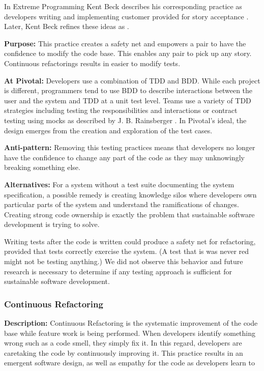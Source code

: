 \begin{table}[]
In Extreme Programming Kent Beck describes his corresponding  practice as developers writing  and implementing customer provided  for story acceptance \cite{ExtremeProgramming2000}. Later, Kent Beck refines these ideas as  \cite{ExtremeProgramming2004}. 

\textbf{Purpose:} This practice creates a safety net and empowers a pair to have the confidence to modify the code base. This enables any pair to pick up any story. Continuous refactorings results in easier to modify tests.

\textbf{At Pivotal:} Developers use a combination of TDD and BDD. While each project is different, programmers tend to use BDD to describe interactions between the user and the system and TDD at a unit test level. Teams use a variety of TDD strategies including testing the responsibilities and interactions \cite{Goose} or contract testing using mocks as described by J. B. Rainsberger \cite{RainsbergerIntegrationTestsYouTube}. In Pivotal's ideal, the design emerges from the creation and exploration of the test cases.  

\textbf{Anti-pattern:} Removing this testing practices means that developers no longer have the confidence to change any part of the code as they may unknowingly breaking something else. 

\textbf{Alternatives:} For a system without a test suite documenting the system specification, a possible remedy is creating knowledge silos where developers own particular parts of the system and understand the ramifications of changes. Creating strong code ownership is exactly the problem that sustainable software development is trying to solve.

Writing tests after the code is written could produce a safety net for refactoring, provided that tests correctly exercise the system. (A test that is was never red might not be testing anything.) We did not observe this behavior and future research is necessary to determine if any testing approach is sufficient for sustainable software development.

\subsubsection{Continuous Refactoring}
\textbf{Description:} Continuous Refactoring is the systematic improvement of the code base while feature work is being performed. When developers identify something wrong such as a code smell, they simply fix it. In this regard, developers are caretaking the code by continuously improving it. This practice results in an emergent software design, as well as empathy for the code as developers learn to  


\end{table}
